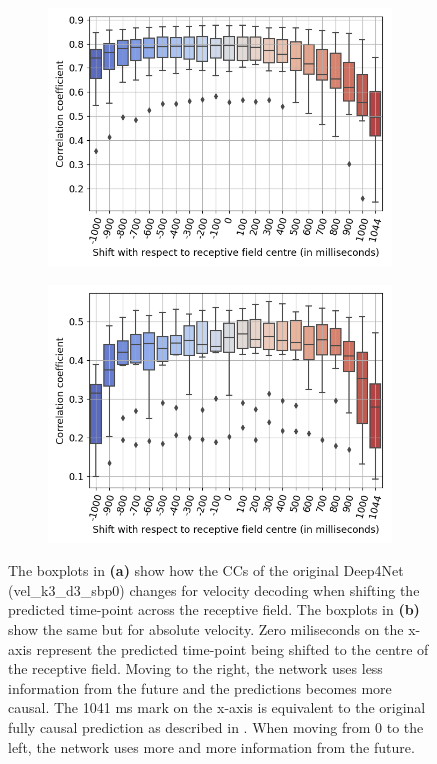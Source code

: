 \begin{figure}[!hpbp]
\centering
\begin{subfigure}[a]{\textwidth}
    \centering
   \includegraphics[width=0.7\linewidth]{img/ch4/vel-shifting-performance-comparison}
   \caption{}
\end{subfigure}\label{fig:vel-shifting-performance}

\begin{subfigure}[b]{\textwidth}
    \centering
   \includegraphics[width=0.7\linewidth]{img/ch4/absVel-shifting-performance-comparison}
   \caption{}
\end{subfigure}\label{fig:absVel-shiftig-performance}
\caption[]{The boxplots in \textbf{(a)} show how the CCs of the original Deep4Net (vel\_k3\_d3\_sbp0) changes for velocity decoding when shifting the predicted time-point across the receptive field.
The boxplots in \textbf{(b)} show the same but for absolute velocity. Zero miliseconds on the x-axis represent the predicted time-point being shifted to the centre of the receptive field.
Moving to the right, the network uses less information from the future and the predictions becomes more causal.
The 1041 ms mark on the x-axis is equivalent to the original fully causal prediction as described in \cite{Hammer-2021}.
When moving from 0 to the left, the network uses more and more information from the future.}
\end{figure}\label{fig:shifting-performance}

